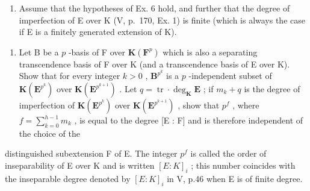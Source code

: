 \begin{enumerate}
\def\labelenumi{\arabic{enumi})}
\setcounter{enumi}{6}
\tightlist
\item
  Assume that the hypotheses of Ex. 6 hold, and further that the degree of imperfection of E over K (V, p.~170, Ex. 1) is finite (which is always the case if E is a finitely generated extension of K).
\end{enumerate}

\begin{enumerate}
\def\labelenumi{\alph{enumi})}
\tightlist
\item
  Let B be a \(p\) -basis of F over \(\mathbf{K}(\mathbf{F}^p)\) which is also a separating transcendence basis of F over K (and a transcendence basis of E over K). Show that for every integer \(k > 0\) , \(\mathbf{B}^{p^k}\) is a \(p\) -independent subset of \(\mathbf{K}(\mathbf{E}^{p^k})\) over \(\mathbf{K}(\mathbf{E}^{p^{k+1}})\) . Let \(q = \operatorname{tr} \cdot \deg_{\mathbf{K}} \mathbf{E}\) ; if \(m_k + q\) is the degree of imperfection of \(\mathbf{K}(\mathbf{E}^{p^k})\) over \(\mathbf{K}(\mathbf{E}^{p^{k+1}})\) , show that \(p^f\) , where \(f = \sum_{k=0}^{h-1} m_k\) , is equal to the degree {[}E : F{]} and is therefore independent of the choice of the
\end{enumerate}

distinguished subextension F of E. The integer \(p^{f}\) is called the order of inseparability of E over K and is written \([E:K]_{i}\) ; this number coincides with the inseparable degree denoted by \([E:K]_{i}\) in V, p.46 when E is of finite degree.

